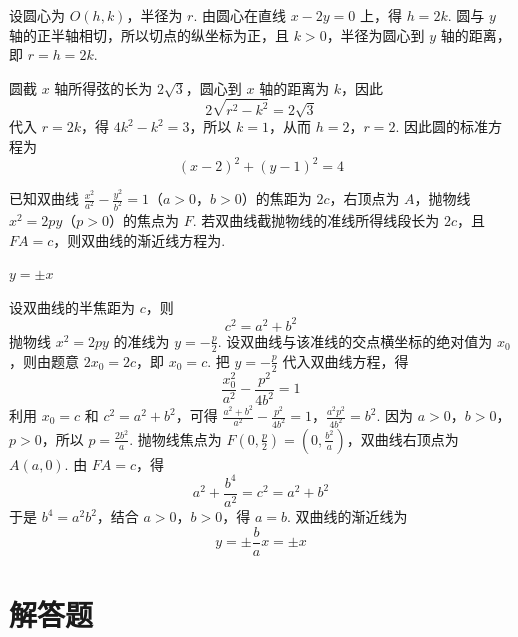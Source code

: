 \begin{solution}
设圆心为 \(O(h,k)\)，半径为 \(r\). 由圆心在直线 \(x-2y=0\) 上，得 \(h=2k\). 圆与 \(y\) 轴的正半轴相切，所以切点的纵坐标为正，且 \(k>0\)，半径为圆心到 \(y\) 轴的距离，即 \(r=h=2k\).

圆截 \(x\) 轴所得弦的长为 \(2\sqrt3\)，圆心到 \(x\) 轴的距离为 \(k\)，因此
\[
2\sqrt{r^2-k^2}=2\sqrt3
\]
代入 \(r=2k\)，得 \(4k^2-k^2=3\)，所以 \(k=1\)，从而 \(h=2\)，\(r=2\). 因此圆的标准方程为
\[
(x-2)^2+(y-1)^2=4
\]
\end{solution}

\begin{problem}
已知双曲线 \(\frac{x^2}{a^2} - \frac{y^2}{b^2} = 1\)（\(a > 0\)，\(b > 0\)）的焦距为 \(2c\)，右顶点为 \(A\)，抛物线 \(x^2 = 2py\)（\(p > 0\)）的焦点为 \(F\). 若双曲线截抛物线的准线所得线段长为 \(2c\)，且 \(FA = c\)，则双曲线的渐近线方程为\fillinblank{}.
\end{problem}

\begin{answer}
\(y = \pm x\)
\end{answer}

\begin{solution}
设双曲线的半焦距为 \(c\)，则
\[
c^2=a^2+b^2
\]
抛物线 \(x^2=2py\) 的准线为 \(y=-\frac p2\). 设双曲线与该准线的交点横坐标的绝对值为 \(x_0\)，则由题意 \(2x_0=2c\)，即 \(x_0=c\). 把 \(y=-\frac p2\) 代入双曲线方程，得
\[
\frac{x_0^2}{a^2}-\frac{p^2}{4b^2}=1
\]
利用 \(x_0=c\) 和 \(c^2=a^2+b^2\)，可得
\(\frac{a^2+b^2}{a^2}-\frac{p^2}{4b^2}=1\)，\(\frac{a^2p^2}{4b^2}=b^2\).
因为 \(a>0\)，\(b>0\)，\(p>0\)，所以 \(p=\frac{2b^2}{a}\). 抛物线焦点为 \(F\left(0,\frac p2\right)=\left(0,\frac{b^2}{a}\right)\)，双曲线右顶点为 \(A(a,0)\). 由 \(FA=c\)，得
\[
a^2+\frac{b^4}{a^2}=c^2=a^2+b^2
\]
于是 \(b^4=a^2b^2\)，结合 \(a>0\)，\(b>0\)，得 \(a=b\). 双曲线的渐近线为
\[
y=\pm\frac ba x=\pm x
\]
\end{solution}

\section{解答题}

